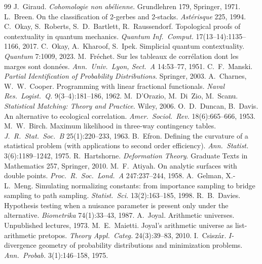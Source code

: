 \documentclass[11pt]{article}
\theoremstyle{definition}
\theoremstyle{remark}
\begin{document}
\begin{thebibliography}{99}
 J.~Giraud. \emph{Cohomologie non ab\'elienne}. Grundlehren 179, Springer, 1971.
 L.~Breen. On the classification of 2-gerbes and 2-stacks. \emph{Ast\'erisque} 225, 1994.
 C.~Okay, S.~Roberts, S.~D.~Bartlett, R.~Raussendorf. Topological proofs of contextuality in quantum mechanics. \emph{Quantum Inf.\ Comput.} 17(13--14):1135--1166, 2017.
 C.~Okay, A.~Kharoof, S.~Ipek. Simplicial quantum contextuality. \emph{Quantum} 7:1009, 2023.
 M.~Fr\'echet. Sur les tableaux de corr\'elation dont les marges sont donn\'ees. \emph{Ann.\ Univ.\ Lyon, Sect.\ A} 14:53--77, 1951.
 C.~F.~Manski. \emph{Partial Identification of Probability Distributions}. Springer, 2003.
 A.~Charnes, W.~W.~Cooper. Programming with linear fractional functionals. \emph{Naval Res.\ Logist.\ Q.} 9(3--4):181--186, 1962.
 M.~D'Orazio, M.~Di~Zio, M.~Scanu. \emph{Statistical Matching: Theory and Practice}. Wiley, 2006.
 O.~D.~Duncan, B.~Davis. An alternative to ecological correlation. \emph{Amer.\ Sociol.\ Rev.} 18(6):665--666, 1953.
 M.~W.~Birch. Maximum likelihood in three-way contingency tables. \emph{J.\ R.\ Stat.\ Soc.\ B} 25(1):220--233, 1963.
 B.~Efron. Defining the curvature of a statistical problem (with applications to second order efficiency). \emph{Ann.\ Statist.} 3(6):1189--1242, 1975.
 R.~Hartshorne. \emph{Deformation Theory}. Graduate Texts in Mathematics 257, Springer, 2010.
 M.~F.~Atiyah. On analytic surfaces with double points. \emph{Proc.\ R.\ Soc.\ Lond.\ A} 247:237--244, 1958.
 A.~Gelman, X.-L.~Meng. Simulating normalizing constants: from importance sampling to bridge sampling to path sampling. \emph{Statist.\ Sci.} 13(2):163--185, 1998.
 R.~B.~Davies. Hypothesis testing when a nuisance parameter is present only under the alternative. \emph{Biometrika} 74(1):33--43, 1987.
 A.~Joyal. Arithmetic universes. Unpublished lectures, 1973.
 M.~E.~Maietti. Joyal's arithmetic universe as list-arithmetic pretopos. \emph{Theory Appl.\ Categ.} 24(3):39--83, 2010.
 I.~Csisz\'ar. $I$-divergence geometry of probability distributions and minimization problems. \emph{Ann.\ Probab.} 3(1):146--158, 1975.
\end{thebibliography}
\end{document}

